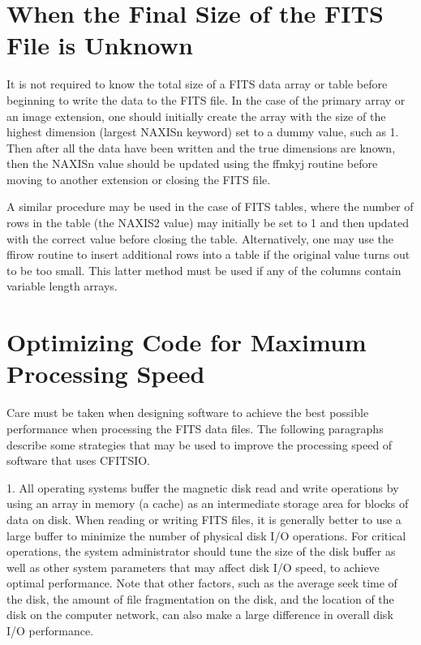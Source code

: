 \section{When the Final Size of the FITS File is Unknown}

It is not required to know the total size of a FITS data array or table
before beginning to write the data to the FITS file.  In the case of
the primary array or an image extension, one should initially create
the array with the size of the highest dimension (largest NAXISn
keyword) set to a dummy value, such as 1.  Then after all the data have
been written and the true dimensions are known, then the NAXISn value
should be updated using the ffmkyj routine before moving to another
extension or closing the FITS file.

A similar procedure may be used in the case of FITS tables, where the
number of rows in the table (the NAXIS2 value) may initially be set to
1 and then updated with the correct value before closing the table.
Alternatively, one may use the ffirow routine to insert additional rows
into a table if the original value turns out to be too small.  This
latter method must be used if any of the columns contain variable
length arrays.


\section{Optimizing Code for Maximum Processing Speed}

Care must be taken when designing software to achieve the best possible
performance when processing the FITS data files.  The following
paragraphs describe some strategies that may be used to improve the
processing speed of software that uses CFITSIO.

1.  All operating systems buffer the magnetic disk read and write
operations by using an array in memory (a cache) as an intermediate
storage area for blocks of data on disk.  When reading or writing FITS
files, it is generally better to use a large buffer to minimize the
number of physical disk I/O operations.  For critical operations, the
system administrator should tune the size of the disk buffer as well as
other system parameters that may affect disk I/O speed, to achieve
optimal performance.  Note that other factors, such as the average seek
time of the disk, the amount of file fragmentation on the disk, and the
location of the disk on the computer network, can also make a large
difference in overall disk I/O performance.

